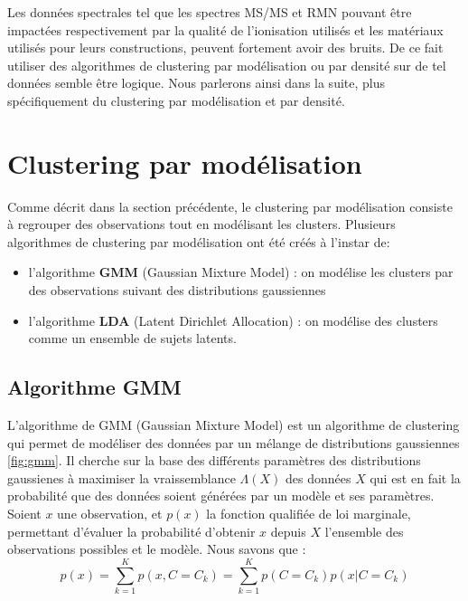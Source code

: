 \documentclass[12pt, french, latin.medieval, a4paper]{report}
\begin{document}
    Les données spectrales tel que les spectres MS/MS et RMN pouvant être impactées respectivement par la qualité de l’ionisation utilisés et les matériaux utilisés pour leurs constructions, peuvent fortement avoir des bruits. De ce fait utiliser des algorithmes de clustering par modélisation ou par densité sur de tel données semble être logique. Nous parlerons ainsi dans la suite, plus spécifiquement du clustering par modélisation et par densité.

    \section{Clustering par modélisation}
        Comme décrit dans la section précédente, le clustering par modélisation consiste à regrouper des observations tout en modélisant les clusters. Plusieurs algorithmes de clustering par modélisation ont été créés à l'instar de:
        
        \begin{itemize}
            \item l'algorithme \textbf{GMM} (Gaussian Mixture Model) : on modélise les clusters par des observations suivant des distributions gaussiennes
            \item l'algorithme \textbf{LDA} (Latent Dirichlet Allocation) : on modélise des clusters comme un ensemble de sujets latents.
        \end{itemize}
        
        \subsection{Algorithme GMM}
            L'algorithme de GMM (Gaussian Mixture Model) \cite{dempster1977maximum} est un algorithme de clustering qui permet de modéliser des données par un mélange de distributions gaussiennes \ref{fig:gmm}. Il cherche sur la base des différents paramètres des distributions gaussienes à maximiser la vraissemblance $\Lambda(X)$ des données $X$ qui est en fait la probabilité que des données soient générées par un modèle et ses paramètres. 
            Soient $x$ une observation, et $p(x)$ la fonction qualifiée de loi marginale, permettant d'évaluer la probabilité d'obtenir $x$ depuis $X$ l'ensemble des observations possibles et le modèle.
            Nous savons que :
            \begin{equation}
                p(x) = \sum_{k=1}^{K} p(x,C=C_k) = \sum_{k=1}^{K} p(C=C_k)p(x|C=C_k)
            \end{equation}
\end{document}
